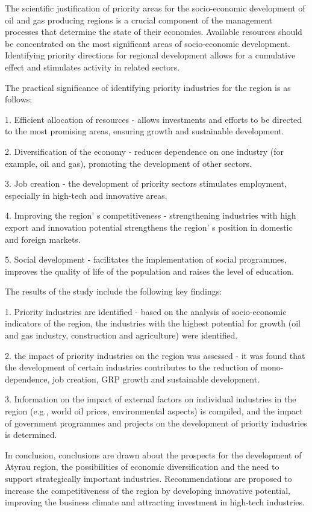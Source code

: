 The scientific justification of priority areas for the socio-economic
development of oil and gas producing regions is a crucial component of
the management processes that determine the state of their economies.
Available resources should be concentrated on the most significant areas
of socio-economic development. Identifying priority directions for
regional development allows for a cumulative effect and stimulates
activity in related sectors.

The practical significance of identifying priority industries for the
region is as follows:

1. Efficient allocation of resources - allows investments and efforts to
be directed to the most promising areas, ensuring growth and sustainable
development.

2. Diversification of the economy - reduces dependence on one industry
(for example, oil and gas), promoting the development of other sectors.

3. Job creation - the development of priority sectors stimulates
employment, especially in high-tech and innovative areas.

4. Improving the region' s competitiveness -
strengthening industries with high export and innovation potential
strengthens the region' s position in domestic and
foreign markets.

5. Social development - facilitates the implementation of social
programmes, improves the quality of life of the population and raises
the level of education.

The results of the study include the following key findings:

1. Priority industries are identified - based on the analysis of
socio-economic indicators of the region, the industries with the highest
potential for growth (oil and gas industry, construction and
agriculture) were identified.

2. the impact of priority industries on the region was assessed - it was
found that the development of certain industries contributes to the
reduction of mono-dependence, job creation, GRP growth and sustainable
development.

3. Information on the impact of external factors on individual
industries in the region (e.g., world oil prices, environmental aspects)
is compiled, and the impact of government programmes and projects on the
development of priority industries is determined.

In conclusion, conclusions are drawn about the prospects for the
development of Atyrau region, the possibilities of economic
diversification and the need to support strategically important
industries. Recommendations are proposed to increase the competitiveness
of the region by developing innovative potential, improving the business
climate and attracting investment in high-tech industries.


